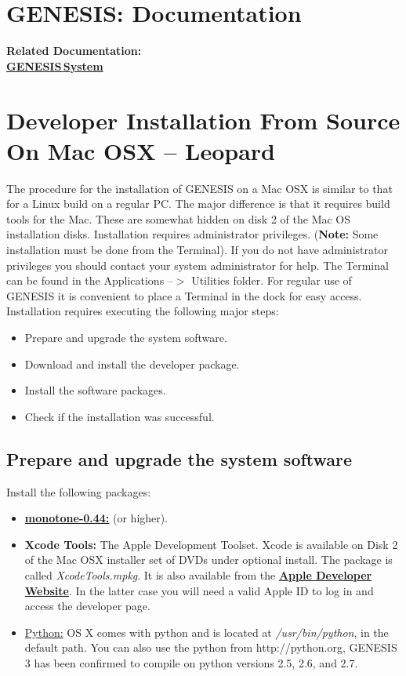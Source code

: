 \documentclass[12pt]{article}
\begin{document}
\section*{GENESIS: Documentation}

{\bf Related Documentation:} \\
\href{../genesis-system/genesis-system.tex}{\bf GENESIS\,System}


\section*{Developer Installation From Source On Mac OSX -- Leopard}

The procedure for the installation of GENESIS on a Mac OSX is similar to that for a Linux build on a regular PC. The major difference is that it requires build tools for the Mac. These are somewhat hidden on disk 2 of the Mac OS installation disks. Installation requires administrator privileges. ({\bf Note:} Some installation must be done from the Terminal). If you do not have administrator privileges you should contact your system administrator for help. The Terminal can be found in the Applications --$>$ Utilities folder. For regular use of GENESIS it is convenient to place a Terminal in the dock for easy access.
Installation requires executing the following major steps:
\begin{itemize}
   \item[] Prepare and upgrade the system software.
   \item[] Download and install the developer package.
   \item[] Install the software packages.
   \item[] Check if the installation was successful. 
\end{itemize}

\subsection*{Prepare and upgrade the system software}

Install the following packages:
\begin{itemize}
   \item[]\href{http://monotone.ca/}{\bf monotone-0.44:} (or higher).
   \item[]{\bf Xcode Tools:} The Apple Development Toolset. Xcode is available on Disk 2 of the Mac OSX installer set of DVDs under optional install. The package is called {\it  XcodeTools.mpkg}. It is also available from the \href{http://developer.apple.com/technology/xcode.html}{\bf Apple Developer Website}. In the latter case  you will need a valid Apple ID to log in and access the developer page.
   
  \item[]\href{http://python.org/}{Python:} OS X comes with python and is located at {\it /usr/bin/python}, in the default path. You can also use the python from http://python.org, GENESIS 3 has been confirmed to compile on python versions 2.5, 2.6, and 2.7. 
\end{itemize}
   
\end{document}
